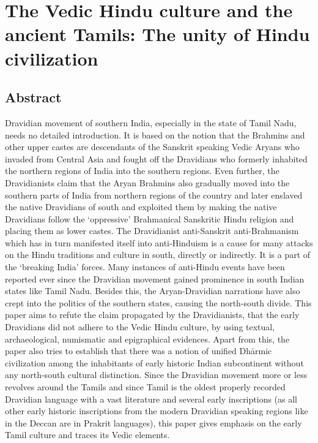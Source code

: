 
\chapter{The Vedic Hindu culture and the ancient Tamils: The unity of Hindu civilization}\label{chapter4}



\section*{Abstract}

Dravidian movement of southern India, especially in the state of Tamil Nadu, needs no detailed introduction. It is based on the notion that the Brahmins and other upper castes are descendants of the Sanskrit speaking Vedic Aryans who invaded from Central Asia and fought off the Dravidians who formerly inhabited the northern regions of India into the southern regions. Even further, the Dravidianists claim that the Aryan Brahmins also gradually moved into the southern parts of India from northern regions of the country and later enslaved the native Dravidians of south and exploited them by making the native Dravidians follow the `oppressive' Brahmanical Sanskritic Hindu religion and placing them as lower castes. The Dravidianist anti-Sanskrit anti-Brahmanism which has in turn manifested itself into anti-Hinduism is a cause for many attacks on the Hindu traditions and culture in south, directly or indirectly. It is a part of the ‘breaking India’ forces. Many instances of anti-Hindu events have been reported ever since the Dravidian movement gained prominence in south Indian states like Tamil Nadu. Besides this, the Aryan-Dravidian narrations have also crept into the politics of the southern states, causing the north-south divide. This paper aims to refute the claim propagated by the Dravidianists, that the early Dravidians did not adhere to the Vedic Hindu culture, by using textual, archaeological, numismatic and epigraphical evidences. Apart from this, the paper also tries to establish that there was a notion of unified Dhārmic civilization among the inhabitants of early historic Indian subcontinent without any north-south cultural distinction. Since the Dravidian movement more or less revolves around the Tamils and since Tamil is the oldest properly recorded Dravidian language with a vast literature and several early inscriptions (as all other early historic inscriptions from the modern Dravidian speaking regions like in the Deccan are in Prakrit languages), this paper gives emphasis on the early Tamil culture and traces its Vedic elements.


